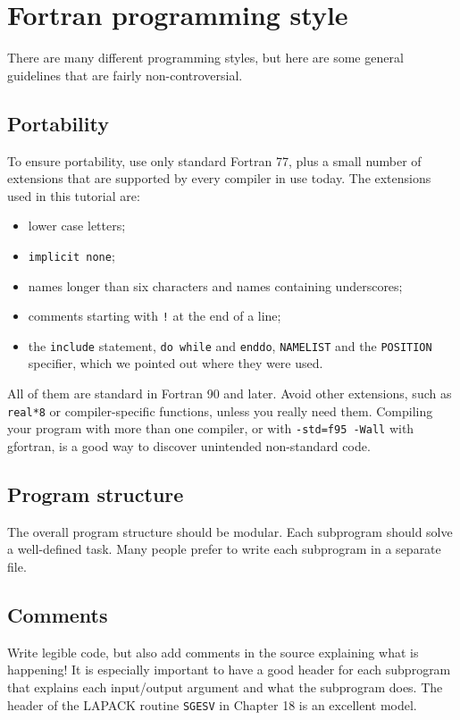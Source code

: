 \chapter{Fortran programming style}

There are many different programming styles, but here are some general guidelines that are fairly non-controversial.

\section{Portability}

To ensure portability, use only standard Fortran 77, plus a small number of extensions that are supported by every compiler in use today. The extensions used in this tutorial are:

\begin{itemize}
    \item lower case letters;
    \item \texttt{implicit none};
    \item names longer than six characters and names containing underscores;
    \item comments starting with \texttt{!} at the end of a line;
    \item the \texttt{include} statement, \texttt{do while} and \texttt{enddo}, \texttt{NAMELIST} and the \texttt{POSITION} specifier, which we pointed out where they were used.
\end{itemize}

All of them are standard in Fortran 90 and later. Avoid other extensions, such as \texttt{real*8} or compiler-specific functions, unless you really need them. Compiling your program with more than one compiler, or with \texttt{-std=f95 -Wall} with gfortran, is a good way to discover unintended non-standard code.

\section{Program structure}

The overall program structure should be modular. Each subprogram should solve a well-defined task. Many people prefer to write each subprogram in a separate file.

\section{Comments}

Write legible code, but also add comments in the source explaining what is happening! It is especially important to have a good header for each subprogram that explains each input/output argument and what the subprogram does. The header of the LAPACK routine \texttt{SGESV} in Chapter 18 is an excellent model.

